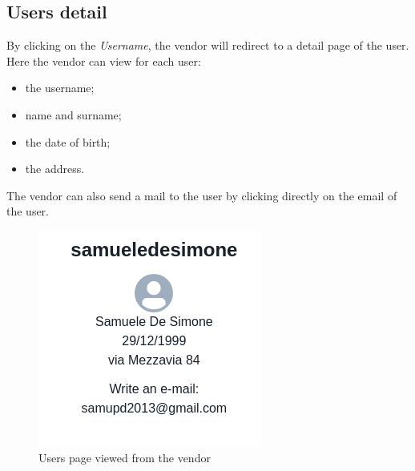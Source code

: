 \subsection{Users detail}
By clicking on the \textit{Username}, the vendor will redirect to a detail page of the user.
Here the vendor can view for each user:
\begin{itemize}
    \item the username;
    \item name and surname;
    \item the date of birth;
    \item the address.
\end{itemize}
The vendor can also send a mail to the user by clicking directly on the email of the user.
\begin{figure}[!ht]
    \caption{Users page viewed from the vendor}
    \vspace{5px}
    \includegraphics[scale=0.75]{../../../../Images/userManual/userDetail.png}
    \centering
\end{figure}
\pagebreak
